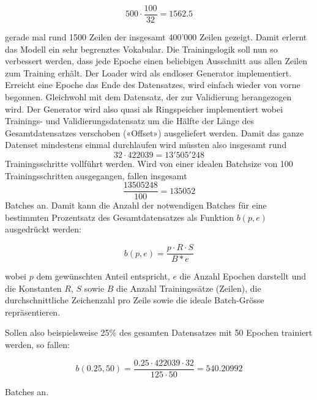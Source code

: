 \[ 500 \cdot \frac{100}{32} = 1562.5 \]

gerade mal rund 1500 Zeilen der insgesamt 400'000 Zeilen gezeigt.
Damit erlernt das Modell ein sehr begrenztes Vokabular.
Die Trainingslogik soll nun so verbessert werden, dass jede Epoche einen beliebigen Ausschnitt aus allen Zeilen zum Training erhält.
Der Loader wird als endloser Generator implementiert.
Erreicht eine Epoche das Ende des Datensatzes, wird einfach wieder von vorne begonnen.
Gleichwohl mit dem Datensatz, der zur Validierung herangezogen wird.
Der Generator wird also quasi als Ringspeicher implementiert wobei Trainings- und Validierungsdatensatz um die Hälfte der Länge des Gesamtdatensatzes
verschoben («Offset») ausgeliefert werden.
Damit das ganze Datenset mindestens einmal durchlaufen wird müssten also insgesamt rund \[ 32 \cdot 422039 = 13'505'248 \] Trainingsschritte vollführt werden.
Wird von einer idealen Batchsize von 100 Trainingsschritten ausgegangen, fallen insgesamt \[ \frac{13505248}{100} = 135052 \] Batches an.
Damit kann die Anzahl der notwendigen Batches für eine bestimmten Prozentsatz des Gesamtdatensatzes als Funktion $ b(p, e) $ ausgedrückt werden:

\[ b(p, e) = \frac{p \cdot R \cdot S}{B * e} \]

wobei $ p $ dem gewünschten Anteil entspricht, $ e $ die Anzahl Epochen darstellt und die Konstanten $ R $, $ S $ sowie $ B $ die Anzahl Trainingssätze (Zeilen), die durchschnittliche Zeichenzahl pro Zeile sowie
die ideale Batch-Grösse repräsentieren.

Sollen also beispielsweise 25\% des gesamten Datensatzes mit 50 Epochen trainiert werden, so fallen:

\[ b(0.25, 50) = \frac{0.25 \cdot 422039 \cdot 32}{125 \cdot 50} = 540.20992 \]

Batches an.

